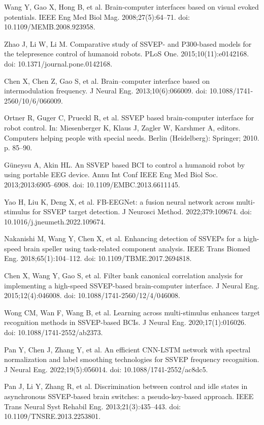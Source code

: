 \documentclass[11pt]{ctexart}
\begin{document}
\begin{enumerate}[label={[\arabic{enumi}]}, leftmargin=3.2em, itemsep=2pt]
\item Wang Y, Gao X, Hong B, et al. Brain-computer interfaces based on visual evoked potentials. IEEE Eng Med Biol Mag. 2008;27(5):64--71. doi: 10.1109/MEMB.2008.923958.
\item Zhao J, Li W, Li M. Comparative study of SSVEP- and P300-based models for the telepresence control of humanoid robots. PLoS One. 2015;10(11):e0142168. doi: 10.1371/journal.pone.0142168.
\item Chen X, Chen Z, Gao S, et al. Brain--computer interface based on intermodulation frequency. J Neural Eng. 2013;10(6):066009. doi: 10.1088/1741-2560/10/6/066009.
\item Ortner R, Guger C, Prueckl R, et al. SSVEP based brain-computer interface for robot control. In: Miesenberger K, Klaus J, Zagler W, Karshmer A, editors. Computers helping people with special needs. Berlin (Heidelberg): Springer; 2010. p. 85--90.
\item G\"uneysu A, Akin HL. An SSVEP based BCI to control a humanoid robot by using portable EEG device. Annu Int Conf IEEE Eng Med Biol Soc. 2013;2013:6905--6908. doi: 10.1109/EMBC.2013.6611145.
\item Yao H, Liu K, Deng X, et al. FB-EEGNet: a fusion neural network across multi-stimulus for SSVEP target detection. J Neurosci Method. 2022;379:109674. doi: 10.1016/j.jneumeth.2022.109674.
\item Nakanishi M, Wang Y, Chen X, et al. Enhancing detection of SSVEPs for a high-speed brain speller using task-related component analysis. IEEE Trans Biomed Eng. 2018;65(1):104--112. doi: 10.1109/TBME.2017.2694818.
\item Chen X, Wang Y, Gao S, et al. Filter bank canonical correlation analysis for implementing a high-speed SSVEP-based brain-computer interface. J Neural Eng. 2015;12(4):046008. doi: 10.1088/1741-2560/12/4/046008.
\item Wong CM, Wan F, Wang B, et al. Learning across multi-stimulus enhances target recognition methods in SSVEP-based BCIs. J Neural Eng. 2020;17(1):016026. doi: 10.1088/1741-2552/ab2373.
\item Pan Y, Chen J, Zhang Y, et al. An efficient CNN-LSTM network with spectral normalization and label smoothing technologies for SSVEP frequency recognition. J Neural Eng. 2022;19(5):056014. doi: 10.1088/1741-2552/ac8dc5.
\item Pan J, Li Y, Zhang R, et al. Discrimination between control and idle states in asynchronous SSVEP-based brain switches: a pseudo-key-based approach. IEEE Trans Neural Syst Rehabil Eng. 2013;21(3):435--443. doi: 10.1109/TNSRE.2013.2253801.

\end{enumerate}
\end{document}
